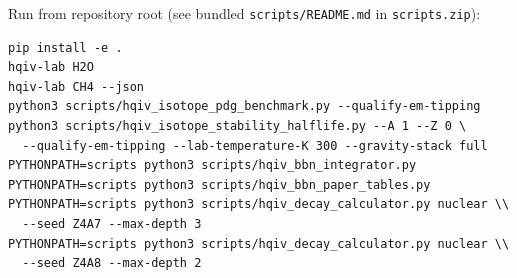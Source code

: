 \documentclass[11pt,notitlepage]{amsart}
\begin{document}
Run from repository root (see bundled \texttt{scripts/README.md} in \texttt{scripts.zip}):
\begin{verbatim}
pip install -e .
hqiv-lab H2O
hqiv-lab CH4 --json
python3 scripts/hqiv_isotope_pdg_benchmark.py --qualify-em-tipping
python3 scripts/hqiv_isotope_stability_halflife.py --A 1 --Z 0 \
  --qualify-em-tipping --lab-temperature-K 300 --gravity-stack full
PYTHONPATH=scripts python3 scripts/hqiv_bbn_integrator.py
PYTHONPATH=scripts python3 scripts/hqiv_bbn_paper_tables.py
PYTHONPATH=scripts python3 scripts/hqiv_decay_calculator.py nuclear \\
  --seed Z4A7 --max-depth 3
PYTHONPATH=scripts python3 scripts/hqiv_decay_calculator.py nuclear \\
  --seed Z4A8 --max-depth 2
\end{verbatim}


{\sloppy\small

}
\end{document}
